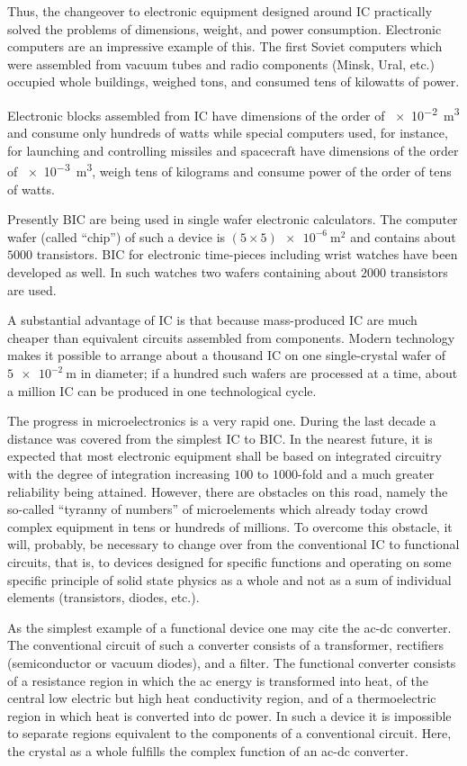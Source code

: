 Thus, the changeover to electronic equipment designed around IC practically solved the problems of dimensions, weight, and power consumption. Electronic computers are an impressive example of this. The first Soviet computers which were assembled from vacuum tubes and radio components (Minsk, Ural, etc.) occupied whole buildings, weighed tons, and consumed tens of kilowatts of power.

Electronic blocks assembled from IC have dimensions of the order of \SI{e-2}{\metre\cubed} and consume only hundreds of watts while special computers used, for instance, for launching and controlling missiles and spacecraft have dimensions of the order of \SI{e-3}{\metre\cubed}, weigh tens of kilograms and consume power of the order of tens of watts.

Presently BIC are being used in single wafer electronic calculators. The computer wafer (called ``chip'') of such a device is $(5\times 5)\SI{e-6}{\metre\squared}$ and contains about $5000$ transistors. BIC for electronic time-pieces including wrist watches have been developed as well. In such watches two wafers containing about $2000$ transistors are used.

A substantial advantage of IC is that because mass-produced IC are much cheaper than equivalent circuits assembled from components. Modern technology makes it possible to arrange about a thousand IC on one single-crystal wafer of $\SI{5e-2}{\metre}$ in diameter; if a hundred such wafers are processed at a time, about a million IC can be produced in one technological cycle.

The progress in microelectronics is a very rapid one. During the last decade a distance was covered from the simplest IC to BIC. In the nearest future, it is expected that most electronic equipment shall be based on integrated circuitry with the degree of integration increasing $100$ to $1000$-fold and a much greater reliability being attained. However, there are obstacles on this road, namely the so-called ``tyranny of numbers'' of microelements which already today crowd complex equipment in tens or hundreds of millions. To overcome this obstacle, it will, probably, be necessary to change over from the conventional IC to functional circuits, that is, to devices designed for specific functions and operating on some specific principle of solid state physics as a whole and not as a sum of individual elements (transistors, diodes, etc.).

As the simplest example of a functional device one may cite the ac-dc converter. The conventional circuit of such a converter consists of a transformer, rectifiers (semiconductor or vacuum diodes), and a filter. The functional converter consists of a resistance region in which the ac energy is transformed into heat, of the central low electric but high heat conductivity region, and of a thermoelectric region in which heat is converted into dc power. In such a device it is impossible to separate regions equivalent to the components of a conventional circuit. Here, the crystal as a whole fulfills the complex function of an ac-dc converter.

